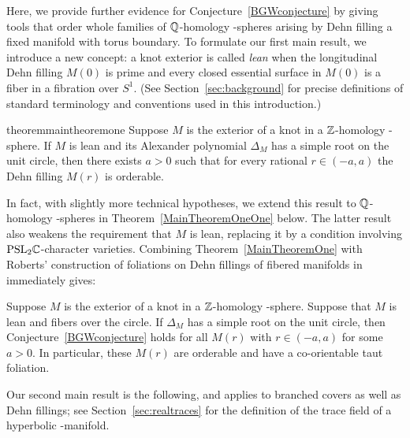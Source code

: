 \documentclass[tikz, sepfignums, defaultenums]{nmd/article}
\begin{document}
Here, we provide further evidence for Conjecture~\ref{BGWconjecture}
by giving tools that order whole families of ${\mathbb Q}$-homology \3-spheres
arising by Dehn filling a fixed manifold with torus boundary.
To formulate our first main result, we
introduce a new concept: a knot exterior is called \emph{lean} when
the longitudinal Dehn filling $M(0)$ is prime and every closed
essential surface in $M(0)$ is a fiber in a fibration over $S^1$.
(See Section~\ref{sec:background} for precise definitions of standard
terminology and conventions used in this introduction.) 

\begin{restatable}{theorem}{maintheoremone}
  \label{MainTheoremOne}
  Suppose $M$ is the exterior of a knot in a ${\mathbb Z}$-homology
  \3-sphere.  If $M$ is lean and its Alexander polynomial
  $\Delta_M$ has a simple root on the unit circle, then there exists
  $a>0$ such that for every rational $r\in (-a, a)$ the Dehn filling
  $M(r)$ is orderable.
\end{restatable}
\noindent
In fact, with slightly more technical hypotheses, we extend this
result to ${\mathbb Q}$\hyp homology \3-spheres in
Theorem~\ref{MainTheoremOneOne} below.  The latter result also weakens
the requirement that $M$ is lean, replacing it by a condition
involving $\mathrm{PSL}_{2} {\mathbb C}$-character varieties.  Combining
Theorem~\ref{MainTheoremOne} with Roberts' construction of foliations
on Dehn fillings of fibered manifolds in \cite{Roberts2001}
immediately gives:

\begin{corollary}
  Suppose $M$ is the exterior of a knot in a ${\mathbb Z}$-homology
  \3-sphere.  Suppose that $M$ is lean and fibers over the circle. If $\Delta_M$
  has a simple root on the unit circle, then
  Conjecture~\ref{BGWconjecture} holds for all $M(r)$ with $r \in (-a,
  a)$ for some $a > 0$.  In particular, these
  $M(r)$ are orderable and have a co-orientable taut foliation.
\end{corollary}


Our second main result is the following, and applies to branched
covers as well as Dehn fillings; see Section~\ref{sec:realtraces} for
the definition of the trace field of a hyperbolic \3-manifold.
\end{document}
